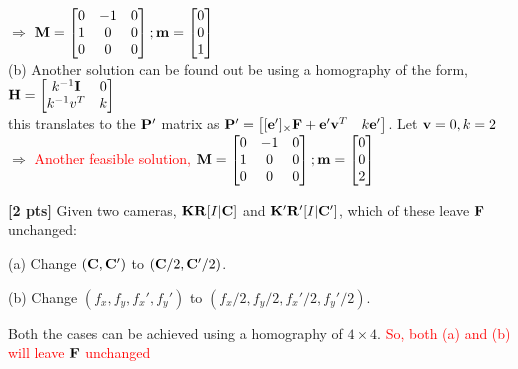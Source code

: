 \documentclass[11pt,addpoints,answers]{exam}
\numberwithin{equation}{section} %
\numberwithin{figure}{section} %
\numberwithin{table}{section} %
\begin{document}
\begin{questions}
\begin{tcolorbox}[fit,height=6cm, width=\textwidth, blank, borderline={0.5pt}{-2pt},halign=left, valign=center, nobeforeafter]
$\Rightarrow$ \textcolor{red}{$\mathbf{M} = \begin{bmatrix}
    0 & -1 & 0\\
    1 & 0 & 0\\
    0 & 0 & 0
\end{bmatrix}; \mathbf{m} = \begin{bmatrix} 0\\0\\1\end{bmatrix} $}\\

(b) Another solution can be found out be using a homography of the form, $\mathbf{H} = \begin{bmatrix} k^{-1} \mathbf{I} & 0\\ k^{-1}v^T & k \end{bmatrix}$\\
this translates to the $\mathbf{P}'$ matrix as $\mathbf{P}' = \begin{bmatrix} [\mathbf{e}']_{\times}\mathbf{F} + \mathbf{e}' \mathbf{v}^T & k \mathbf{e}' \end{bmatrix}$. Let $\mathbf{v}=0, k =2$\\

$\Rightarrow$ \textcolor{red}{Another feasible solution, $\mathbf{M} = \begin{bmatrix}
    0 & -1 & 0\\
    1 & 0 & 0\\
    0 & 0 & 0
\end{bmatrix}; \mathbf{m} = \begin{bmatrix} 0\\0\\2\end{bmatrix} $ }

\end{tcolorbox}

\question \textbf{[2 pts]} Given two cameras, $\mathbf{K}\mathbf{R}[I | \mathbf{C}]$ and $\mathbf{K}'\mathbf{R}'[I | \mathbf{C}']$, which of these leave $\mathbf{F}$ unchanged:

(a) Change $\left(\mathbf{C}, \mathbf{C}'\right)$ to $\left(\mathbf{C} / 2, \mathbf{C}' /2 \right)$.

(b) Change $\left(f_x, f_y, f_x', f_y'\right)$ to $\left(f_x/2, f_y/2, f_x'/2, f_y'/2\right)$.

\begin{tcolorbox}[fit,height=5cm, width=\textwidth, blank, borderline={0.5pt}{-2pt},halign=left, valign=center, nobeforeafter]

Both the cases can be achieved using a homography of $4 \times 4$. \textcolor{red}{So, both (a) and (b) will leave $\mathbf{F}$ unchanged}

\end{tcolorbox}

\end{questions}
\end{document}
